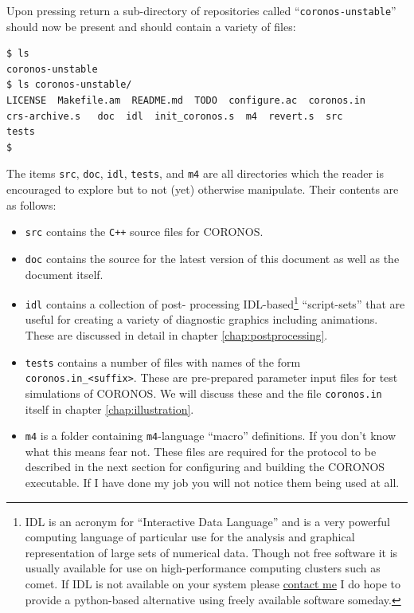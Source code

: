 \documentclass[12pt, letterpaper, oneside, leqno, openright]{memoir}
\newcommand{\coronos}{\textsf{CORONOS}}
\begin{document}
%
\par
%
Upon pressing return a sub-directory of repositories called
``\texttt{coronos-unstable}'' should now be present
and should contain a variety of files:
%
%
\begin{verbatim}
$ ls 
coronos-unstable
$ ls coronos-unstable/
LICENSE  Makefile.am  README.md  TODO  configure.ac  coronos.in
crs-archive.s	doc  idl  init_coronos.s  m4  revert.s	src  
tests
$ 
\end{verbatim}
%
The items \texttt{src}, \texttt{doc}, \texttt{idl},
\texttt{tests}, and \texttt{m4} are all directories
which the reader is encouraged to explore but to not 
(yet) otherwise manipulate. Their contents are as 
follows:
%
%
\begin{itemize}
  \item{\texttt{src} contains the \texttt{C++} source 
    files for \coronos.} 
  \item{ \texttt{doc} contains the source for the 
          latest version of this document as well 
          as the document itself.} 
  \item{\texttt{idl} contains a collection of post-
         processing IDL-based\footnote{IDL is an 
         acronym for ``Interactive Data Language''
         and is a very powerful computing language
         of particular use for the analysis and
         graphical representation of large sets
         of numerical data. Though not free software
         it is usually available for use on
         high-performance computing clusters such as
         comet. If IDL is not available on your system 
         please \href{mailto:tdennis10@alaska.edu}{contact me}
         I do hope to provide a python-based alternative
         using freely available software someday.}
         ``script-sets'' that are useful for creating 
         a variety of diagnostic graphics including
         animations.  These are discussed in detail
         in chapter \ref{chap:postprocessing}.
       }
%
%
     \item{ \texttt{tests} contains a number of 
            files with names of the form\newline
            \texttt{coronos.in\_<suffix>}.
            These are pre-prepared parameter input
            files for test simulations of \coronos.
            We will discuss these and the file
            \texttt{coronos.in} itself in chapter
            \ref{chap:illustration}.
          }
     \item{\texttt{m4} is a folder containing
           \texttt{m4}-language ``macro'' definitions.
           If you don't know what this means fear not.
           These files are required for the protocol
           to be described in the next section for
           configuring and building the \coronos
           executable. If I have done my job you will
           not notice them being used at all.
          }
\end{itemize}
\end{document}

